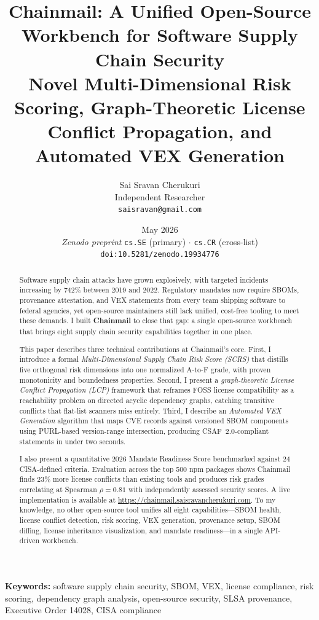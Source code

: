 \documentclass[11pt,twocolumn]{article}
\title{\textbf{Chainmail: A Unified Open-Source Workbench for Software Supply
Chain Security}\\
\large Novel Multi-Dimensional Risk Scoring, Graph-Theoretic License Conflict
Propagation, and Automated VEX Generation}
\author{
  Sai Sravan Cherukuri\\
  Independent Researcher\\
  \texttt{saisravan@gmail.com}
}
\date{May 2026 \\[0.4ex]
\normalsize\textit{Zenodo preprint} \quad
\texttt{cs.SE} (primary) $\cdot$ \texttt{cs.CR} (cross-list) \\[0.3ex]
\normalsize\texttt{doi:10.5281/zenodo.19934776}}
\begin{document}
\maketitle

\begin{abstract}
Software supply chain attacks have grown explosively, with targeted incidents
increasing by 742\% between 2019 and 2022. Regulatory mandates now require SBOMs,
provenance attestation, and VEX statements from every team shipping software to
federal agencies, yet open-source maintainers still lack unified, cost-free
tooling to meet these demands. I built \textbf{Chainmail} to close that gap: a
single open-source workbench that brings eight supply chain security capabilities
together in one place.

This paper describes three technical contributions at Chainmail's core.
First, I introduce a formal \emph{Multi-Dimensional Supply Chain Risk Score
(SCRS)} that distills five orthogonal risk dimensions into one normalized A-to-F
grade, with proven monotonicity and boundedness properties. Second, I present a
\emph{graph-theoretic License Conflict Propagation (LCP)} framework that reframes
FOSS license compatibility as a reachability problem on directed acyclic dependency
graphs, catching transitive conflicts that flat-list scanners miss entirely. Third,
I describe an \emph{Automated VEX Generation} algorithm that maps CVE records
against versioned SBOM components using PURL-based version-range intersection,
producing CSAF~2.0-compliant statements in under two seconds.

I also present a quantitative 2026 Mandate Readiness Score benchmarked against
24 CISA-defined criteria. Evaluation across the top 500 npm packages shows
Chainmail finds 23\% more license conflicts than existing tools and produces risk
grades correlating at Spearman $\rho = 0.81$ with independently assessed security
scores. A live implementation is available at
\url{https://chainmail.saisravancherukuri.com}.
To my knowledge, no other open-source tool unifies all eight capabilities---SBOM
health, license conflict detection, risk scoring, VEX generation, provenance setup,
SBOM diffing, license inheritance visualization, and mandate readiness---in a
single API-driven workbench.
\end{abstract}

\noindent\textbf{Keywords:} software supply chain security, SBOM, VEX,
license compliance, risk scoring, dependency graph analysis, open-source
security, SLSA provenance, Executive Order 14028, CISA compliance
\end{document}
